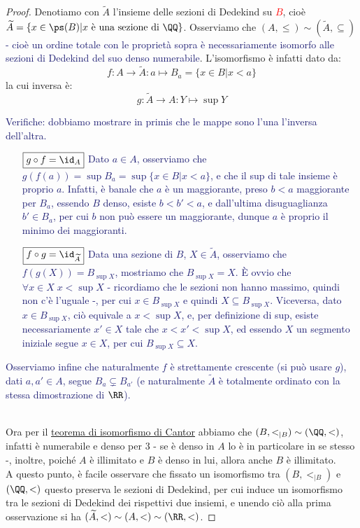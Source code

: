 \begin{proof}
	Denotiamo con $\widetilde{A}$ l'insieme delle sezioni di Dedekind su \textcolor{red}{$B$}, cioè $\widetilde{A} = \{x \in \ps(B) | \text{$x$ è una sezione di $\QQ$}\}$.
	Osserviamo che $(A,\leq) \sim (\widetilde{A},\subseteq)$ \textcolor{MidnightBlue}{- cioè un ordine totale con le proprietà sopra è necessariamente isomorfo alle sezioni di Dedekind del suo denso numerabile}.
	L'isomorfismo è infatti dato da:
	\[ f : A \rightarrow \widetilde{A} : a \mapsto B_a = \{x \in B | x < a\}
		\]
	la cui inversa è:
	\[ g : \widetilde{A} \rightarrow A : Y \mapsto \sup Y
		\]
	\textcolor{MidnightBlue}{Verifiche: dobbiamo mostrare in primis che le mappe sono l'una l'inversa dell'altra.
	\begin{itemize}
			\item[$\boxed{g \circ f = \id_A}$] Dato $a \in A$, osserviamo che $g(f(a)) = \sup B_a = \sup\{x \in B | x < a\}$, e che il sup di tale insieme è proprio $a$. Infatti, è banale che $a$ è un maggiorante,
			preso $b < a$ maggiorante per $B_a$, essendo $B$ denso, esiste $b < b ' < a$, e dall'ultima disuguaglianza $b' \in B_a$, per cui $b$ non può essere un maggiorante, dunque $a$ è proprio il minimo dei maggioranti.
			\item[$\boxed{f \circ g = \id_{\widetilde{A}}}$] Data una sezione di $B$, $X \in \widetilde{A}$, osserviamo che $f(g(X)) = B_{\sup X}$, mostriamo che $B_{\sup X} = X$. È ovvio che $\forall x \in X \; x < \sup X$ - ricordiamo che le sezioni non hanno massimo, quindi non c'è l'uguale -,
			per cui $x \in B_{\sup X}$ e quindi $X \subseteq B_{\sup X}$. Viceversa, dato $x \in B_{\sup X}$, ciò equivale a $x < \sup X$, e, per definizione di sup, esiste necessariamente $x' \in X$ tale che $x < x' < \sup X$, ed essendo $X$ un segmento iniziale segue $x \in X$, per cui $B_{\sup X} \subseteq X$.
	\end{itemize}
	Osserviamo infine che naturalmente $f$ è strettamente crescente (si può usare $g$), dati $a,a' \in A$, segue $B_a \subsetneq B_{a'}$ (e naturalmente $\widetilde{A}$ è totalmente ordinato con la stessa dimostrazione di $\RR$).}\\
	Ora per il \hyperref[isoCantor]{teorema di isomorfismo di Cantor} abbiamo che $(B,<_{|B}) \sim (\QQ,<)$, infatti è numerabile e denso per 3 - se è denso in $A$ lo è in particolare in se stesso -,
	inoltre, poiché $A$ è illimitato e $B$ è denso in lui, allora anche $B$ è illimitato.\\
	A questo punto, è facile osservare che fissato un isomorfismo tra $(B,<_{|B})$ e $(\QQ,<)$ questo preserva le sezioni di Dedekind, per cui induce un isomorfismo tra le sezioni di Dedekind dei rispettivi due insiemi,
	e unendo ciò alla prima osservazione si ha $(\widetilde{A},<) \sim (A,<) \sim (\RR,<)$.
\end{proof}

